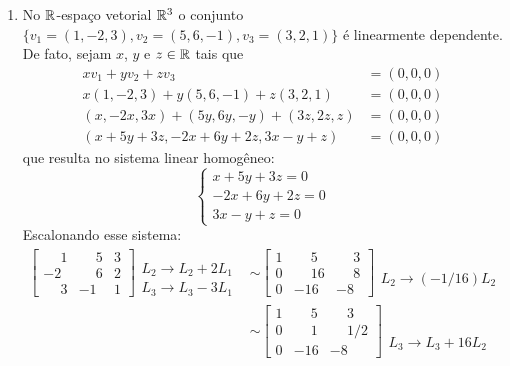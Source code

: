 \begin{exemplos}
\begin{enumerate}
		\item No $\mathbb{R}$-espaço vetorial $\mathbb{R}^3$ o conjunto $\{v_1 = (1, -2, 3), v_2 = (5, 6, -1), v_3 = (3, 2, 1)\}$ é linearmente dependente. De fato,
			sejam $x$, $y$ e $z \in \mathbb{R}$ tais que
			\begin{align*}
				xv_1 + yv_2 + zv_3 &= (0, 0, 0)\\
				x(1, -2, 3) + y(5, 6, -1) + z(3, 2, 1) &= (0, 0, 0)\\
				(x, -2x, 3x) + (5y, 6y, -y) + (3z, 2z, z) &= (0, 0, 0)\\
				(x + 5y + 3z, -2x + 6y + 2z, 3x - y + z) &= (0, 0, 0)
			\end{align*}
			que resulta no sistema linear homogêneo:
			\[
				\begin{cases}
					x + 5y + 3z = 0\\
					-2x + 6y + 2z = 0\\
					3x - y + z = 0
				\end{cases}
			\]
			Escalonando esse sistema:
			\begin{align*}
				\begin{bmatrix}
					\phantom{-} 1 & \phantom{-} 5 & 3\\
					-2 & \phantom{-} 6 & 2\\
					\phantom{-} 3 & -1 & 1
				\end{bmatrix}
				\begin{array}{l}
					\phantom{x}\\L_2 \to L_2 + 2L_1\\L_3 \to L_3 - 3L_1
				\end{array}&\sim
				\begin{bmatrix}
					1 & \phantom{-} 5 & \phantom{-} 3\\
					0 & \phantom{-} 16 & \phantom{-} 8\\
					0 & -16 & -8
				\end{bmatrix}
				\begin{array}{l}
					\phantom{x}\\L_2 \to (-1/16)L_2\phantom{x}
				\end{array}\\&\sim
				\begin{bmatrix}
					1 & \phantom{-} 5 & \phantom{-} 3\\
					0 & \phantom{-} 1 & \phantom{-} 1/2\\
					0 & -16 & -8
				\end{bmatrix}
				\begin{array}{l}
					\phantom{x}\\\phantom{x}\\L_3 \to L_3 + 16L_2

\end{array}
\end{align*}
\end{enumerate}
\end{exemplos}
